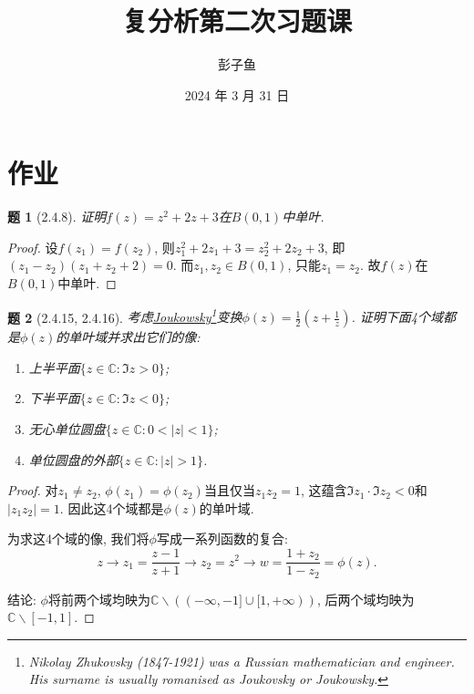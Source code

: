 \documentclass{article}[a4paper, 12pt]
\newtheorem{problem}{题}
\begin{document}
\title{复分析第二次习题课}
\author{彭子鱼}
\date{2024 年 3 月 31 日}

\maketitle

\section{作业}

\begin{problem}[2.4.8]
证明\(f(z)=z^2+2z+3\)在\(B(0,1)\)中单叶.
\end{problem}

\begin{proof}
  设\(f(z_1)=f(z_2)\), 则\(z_1^2+2z_1+3=z_2^2+2z_2+3\), 即\((z_1-z_2)(z_1+z_2+2)=0\). 而\(z_1,z_2\in B(0,1)\), 只能\(z_1=z_2\). 故\(f(z)\)在\(B(0,1)\)中单叶.
\end{proof}

\begin{problem}[2.4.15, 2.4.16]
  考虑\href{https://en.wikipedia.org/wiki/Joukowsky_transform}{Joukowsky\footnote{Nikolay Zhukovsky (1847-1921) was a Russian mathematician and engineer. His surname is usually romanised as Joukovsky or Joukowsky.}变换}\(\phi(z)=\frac12\left(z+\frac1z\right)\). 证明下面4个域都是\(\phi(z)\)的单叶域并求出它们的像:
  \begin{enumerate}
    \item 上半平面\(\{z\in\mathbb{C}:\Im z>0\}\);
    \item 下半平面\(\{z\in\mathbb{C}:\Im z<0\}\);
    \item 无心单位圆盘\(\{z\in\mathbb{C}:0<|z|<1\}\);
    \item 单位圆盘的外部\(\{z\in\mathbb{C}:|z|>1\}\).
  \end{enumerate}
\end{problem}

\begin{proof}
  对\(z_1\ne z_2\), \(\phi(z_1)=\phi(z_2)\)当且仅当\(z_1z_2=1\), 这蕴含\(\Im z_1\cdot\Im z_2<0\)和\(|z_1z_2|=1\). 因此这4个域都是\(\phi(z)\)的单叶域. 

  为求这4个域的像, 我们将\(\phi\)写成一系列函数的复合:
  \[z\longrightarrow z_1=\frac{z-1}{z+1}\longrightarrow z_2=z^2\longrightarrow w=\frac{1+z_2}{1-z_2}=\phi(z).\]

  结论: \(\phi\)将前两个域均映为\(\mathbb{C}\backslash((-\infty,-1]\cup[1,+\infty))\), 后两个域均映为\(\mathbb{C}\backslash[-1,1]\).
\end{proof}
\end{document}
